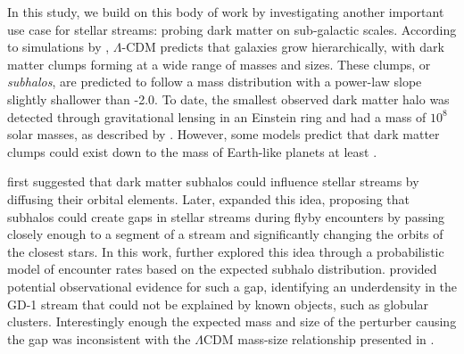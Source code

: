 \documentclass[draft]{aa}
\begin{document}
  
  


  In this study, we build on this body of work by investigating another important use case for stellar streams: probing dark matter on sub-galactic scales. According to simulations by \citet{2008MNRAS.391.1685S}, $\Lambda$-CDM predicts that galaxies grow hierarchically, with dark matter clumps forming at a wide range of masses and sizes. These clumps, or \textit{subhalos}, are predicted to follow a mass distribution with a power-law slope slightly shallower than -2.0. To date, the smallest observed dark matter halo was detected through gravitational lensing in an Einstein ring and had a mass of $10^8$ solar masses, as described by \citet{2012Natur.481..341V}. However, some models predict that dark matter clumps could exist down to the mass of Earth-like planets at least \citep[see][ and discussion in \citet{2021arXiv211101148A}]{2005JCAP...08..003G, wang20}. 


  \citet{2002MNRAS.332..915I} first suggested that dark matter subhalos could influence stellar streams by diffusing their orbital elements. Later, \citet{2012ApJ...748...20C} expanded this idea, proposing that subhalos could create gaps in stellar streams during flyby encounters by passing closely enough to a segment of a stream and significantly changing the orbits of the closest stars. In this work, \citet{2012ApJ...748...20C} further explored this idea through a probabilistic model of encounter rates based on the expected subhalo distribution. \citet{2019ApJ...880...38B} provided potential observational evidence for such a gap, identifying an underdensity in the GD-1 stream that could not be explained by known objects, such as globular clusters. Interestingly enough the expected mass and size of the perturber causing the gap was inconsistent with the $\Lambda$CDM mass-size relationship presented in \cite{2017MNRAS.466.4974M}.
\end{document}
